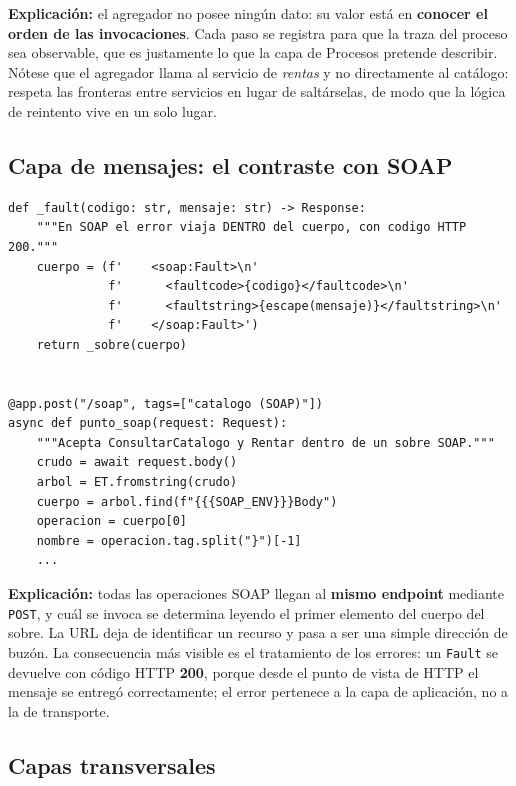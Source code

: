 \documentclass[12pt]{article}
\begin{document}
\noindent\textbf{Explicación:} el agregador no posee ningún dato: su valor está en \textbf{conocer el orden de las invocaciones}. Cada paso se registra para que la traza del proceso sea observable, que es justamente lo que la capa de Procesos pretende describir. Nótese que el agregador llama al servicio de \textit{rentas} y no directamente al catálogo: respeta las fronteras entre servicios en lugar de saltárselas, de modo que la lógica de reintento vive en un solo lugar.

\subsection{Capa de mensajes: el contraste con SOAP}

\begin{lstlisting}[caption={Endpoint único y errores dentro del cuerpo (catalogo.py)}]
def _fault(codigo: str, mensaje: str) -> Response:
    """En SOAP el error viaja DENTRO del cuerpo, con codigo HTTP 200."""
    cuerpo = (f'    <soap:Fault>\n'
              f'      <faultcode>{codigo}</faultcode>\n'
              f'      <faultstring>{escape(mensaje)}</faultstring>\n'
              f'    </soap:Fault>')
    return _sobre(cuerpo)


@app.post("/soap", tags=["catalogo (SOAP)"])
async def punto_soap(request: Request):
    """Acepta ConsultarCatalogo y Rentar dentro de un sobre SOAP."""
    crudo = await request.body()
    arbol = ET.fromstring(crudo)
    cuerpo = arbol.find(f"{{{SOAP_ENV}}}Body")
    operacion = cuerpo[0]
    nombre = operacion.tag.split("}")[-1]
    ...
\end{lstlisting}

\noindent\textbf{Explicación:} todas las operaciones SOAP llegan al \textbf{mismo endpoint} mediante \texttt{POST}, y cuál se invoca se determina leyendo el primer elemento del cuerpo del sobre. La URL deja de identificar un recurso y pasa a ser una simple dirección de buzón. La consecuencia más visible es el tratamiento de los errores: un \texttt{Fault} se devuelve con código HTTP \textbf{200}, porque desde el punto de vista de HTTP el mensaje se entregó correctamente; el error pertenece a la capa de aplicación, no a la de transporte.

\subsection{Capas transversales}
\end{document}
